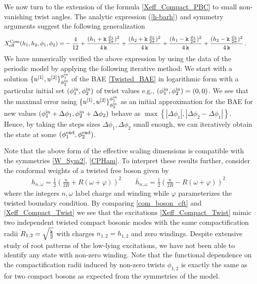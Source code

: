 \documentclass[12pt]{article}
\numberwithin{equation}{section}
\newcommand{\kk}{{\tt k}}
\begin{document}
	We now turn to the extension of the formula \eqref{Xeff_Compact_PBC} to small non-vanishing twist angles. The analytic expression (\ref{h-barh}) and symmetry arguments suggest the following generalization
	\begin{align}
		X^{\rm{Com}}_{\rm{eff}}(h_1,h_2,\phi_1,\phi_2)=& -\frac{4}{12}+\frac{(h_1+           \kk \,   \frac{\phi_1}{2\pi}      )^2}{4 \,\kk}
		+\frac{( h_2+           \kk \,   \frac{\phi_2}{2\pi}        )^2}{4 \,\kk}+\frac{( h_1-           \kk \,   \frac{\phi_1}{2\pi}      )^2}{4\, \kk}+\frac{( h_2-           \kk \,  \frac{\phi_2}{2\pi}      )^2}{4\, \kk}\,.\label{Xeff_Compact_Twist}
	\end{align}
	We have numerically verified the above expression by using the data of the periodic model by applying the following iterative method: We start with a solution $\{u^{[1]},u^{[2]}\}^{\phi^ { \rm{in}}_1}_{\phi^ {\rm{in}}_2}$ of the BAE \eqref{Twisted_BAE} in logarithmic form with a particular
	initial set $(\phi^{ \rm{in}}_1,\phi^{ \rm{in}}_{2})$ of twist
	values  e.g., $(\phi^{ \rm{in}}_1,\phi^{ \rm{in}}_{2})=(0,0)$. We see that the maximal error using $\{u^{[1]},u^{[2]}\}^{\phi^{ \rm{in}}_1}_{\phi^{ \rm{in}}_2}$ as an initial approximation for the BAE for new values $(\phi^{ \rm{in}}_1+\Delta \phi_1,\phi^{ \rm{in}}_{2}+\Delta \phi_2)$ behave as $\max\left\{|\Delta\phi_1|,|\Delta\phi_2-\Delta\phi_1|\right\}$. Hence, by taking the steps sizes  $\Delta \phi_1,\Delta \phi_2$ small enough, we can iteratively obtain the state at some $(\phi^{ \rm{end}}_1,\phi^{ \rm{end}}_{2})$. 
	
	
	Note that the above form of the effective scaling dimensions is compatible with the symmetries \eqref{W_Sym2},  \eqref{CPHam}. To interpret these results further, consider the conformal weights of a twisted free boson given by \cite{DiFr97}
	\begin{align}
		h_{n,\omega}=\frac{1}{2}\left(\frac{n}{2R}+R (\omega+\varphi)\right)^2 \qquad  \bar{h}_{n,\omega}=\frac{1}{2}\left(\frac{n}{2R}- R (\omega+\varphi)\right)^2
		\label{com_boson_cft}
	\end{align}
	where the integers $n, \omega$ label charge and winding while $\varphi$ parameterizes the twisted boundary condition. By comparing \eqref{com_boson_cft} and \eqref{Xeff_Compact_Twist} we see that the excitations \eqref{Xeff_Compact_Twist} mimic two independent twisted compact bosonic modes with the same compactification radii $R_{1,2}=\sqrt{\frac{\kk}{2}}$ with  charges $n_{1,2}=h_{1,2}$ and zero windings. Despite extensive study of root patterns of the low-lying excitations, we have not been able to identify any state with non-zero winding. Note that the functional dependence on the compactification radii induced by non-zero twists $\phi_{1,2}$ is exactly the same as for two compact bosons as expected from the symmetries of the model.
	
\end{document}
